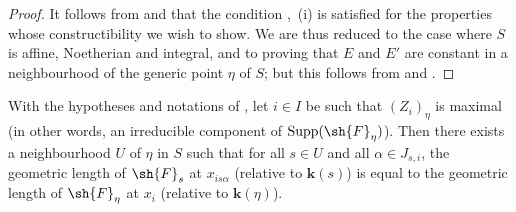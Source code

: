 \begin{proof}
\label{IV.9.8.5-proof}
It follows from  and  that the condition ,~(i) is satisfied for the properties whose constructibility we wish to show.
We are thus reduced to the case where $S$ is affine, Noetherian and integral, and to proving that $E$ and $E'$ are constant in a neighbourhood of the generic point $\eta$ of $S$; but this follows from  and .
\end{proof}

\begin{proposition}[9.8.6]
\label{IV.9.8.6}
With the hypotheses and notations of \emph{}, let $i\in I$ be such that $(Z_i)_\eta$ is maximal (in other words, an irreducible component of $\operatorname{Supp}(\sh{F}_\eta)$).
Then there exists a neighbourhood $U$ of $\eta$ in $S$ such that for all $s\in U$ and all $\alpha\in J_{s,i}$, the geometric length of $\sh{F}_s$ at $x_{is\alpha}$ (relative to $\mathbf{k}(s)$)  is equal to the geometric length of $\sh{F}_\eta$ at $x_i$ (relative to $\mathbf{k}(\eta)$).
\end{proposition}

